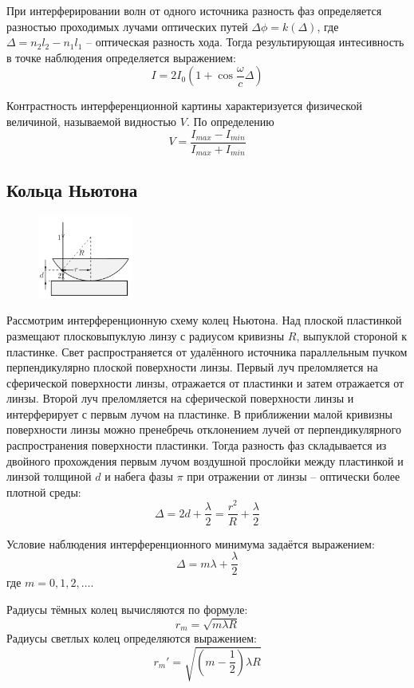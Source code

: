 При интерферировании волн от одного источника разность фаз определяется 
разностью проходимых лучами оптических путей $\Delta \phi = k (\Delta)$, где 
$\Delta = n_2 l_2 - n_1 l_1$ -- оптическая разность хода. Тогда результирующая 
интесивность в точке наблюдения определяется выражением:
$$
I = 2I_0 \left( 1 + \cos \frac{\omega}{c} \Delta \right)
$$

Контрастность интерференционной картины характеризуется физической величиной, 
называемой видностью $V$. По определению
$$
V = \frac{I_{max} - I_{min}}{I_{max} + I_{min}}
$$

\subsection*{Кольца Ньютона}

\begin{figure}
	\centering
	\includegraphics[width=0.28\textwidth]{../Изображения/Кольца Ньютона.png}
\end{figure}

Рассмотрим интерференционную схему колец Ньютона. Над плоской пластинкой 
размещают плосковыпуклую линзу с радиусом кривизны $R$, выпуклой стороной к 
пластинке. Свет 
распространяется от удалённого источника параллельным пучком перпендикулярно 
плоской поверхности линзы. Первый луч преломляется на сферической поверхности 
линзы, отражается от пластинки и затем отражается от линзы. Второй луч 
преломляется на сферической поверхности линзы  и интерферирует с первым лучом 
на пластинке. В приближении малой кривизны поверхности линзы можно пренебречь 
отклонением лучей от перпендикулярного распространения поверхности пластинки. 
Тогда разность фаз складывается из двойного прохождения первым 
лучом воздушной прослойки между пластинкой и линзой толщиной $d$ и набега фазы 
$\pi$ при отражении от линзы -- оптически более плотной среды:
$$
\Delta = 2 d + \frac{\lambda}{2} = \frac{r^2}{R} + \frac{\lambda}{2}
$$

Условие наблюдения интерференционного минимума задаётся выражением:
$$
\Delta = m \lambda + \frac{\lambda}{2}
$$
где $m = 0, 1, 2, \dots$.

Радиусы тёмных колец вычисляются по формуле:
$$
r_m = \sqrt{m \lambda R}
$$
Радиусы светлых колец определяются выражением:
$$
r_m' = \sqrt{(m - \frac{1}{2}) \lambda R}
$$